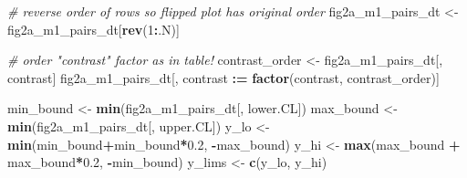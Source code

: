 \documentclass[]{book}
\newenvironment{Shaded}{\begin{snugshade}}{\end{snugshade}}
\newcommand{\CommentTok}[1]{\textcolor[rgb]{0.56,0.35,0.01}{\textit{#1}}}
\newcommand{\DecValTok}[1]{\textcolor[rgb]{0.00,0.00,0.81}{#1}}
\newcommand{\ErrorTok}[1]{\textcolor[rgb]{0.64,0.00,0.00}{\textbf{#1}}}
\newcommand{\FloatTok}[1]{\textcolor[rgb]{0.00,0.00,0.81}{#1}}
\newcommand{\KeywordTok}[1]{\textcolor[rgb]{0.13,0.29,0.53}{\textbf{#1}}}
\newcommand{\NormalTok}[1]{#1}
\newcommand{\OperatorTok}[1]{\textcolor[rgb]{0.81,0.36,0.00}{\textbf{#1}}}
\newcommand{\StringTok}[1]{\textcolor[rgb]{0.31,0.60,0.02}{#1}}
\begin{document}
\begin{Shaded}
\begin{Highlighting}[]
\CommentTok{# reverse order of rows so flipped plot has original order}
\NormalTok{fig2a_m1_pairs_dt <-}\StringTok{ }\NormalTok{fig2a_m1_pairs_dt[}\KeywordTok{rev}\NormalTok{(}\DecValTok{1}\OperatorTok{:}\NormalTok{.N)]}

\CommentTok{# order "contrast" factor as in table!}
\NormalTok{contrast_order <-}\StringTok{ }\NormalTok{fig2a_m1_pairs_dt[, contrast]}
\NormalTok{fig2a_m1_pairs_dt[, contrast }\OperatorTok{:}\ErrorTok{=}\StringTok{ }\KeywordTok{factor}\NormalTok{(contrast, contrast_order)]}

\NormalTok{min_bound <-}\StringTok{ }\KeywordTok{min}\NormalTok{(fig2a_m1_pairs_dt[, lower.CL])}
\NormalTok{max_bound <-}\StringTok{ }\KeywordTok{min}\NormalTok{(fig2a_m1_pairs_dt[, upper.CL])}
\NormalTok{y_lo <-}\StringTok{ }\KeywordTok{min}\NormalTok{(min_bound}\OperatorTok{+}\NormalTok{min_bound}\OperatorTok{*}\FloatTok{0.2}\NormalTok{,}
            \OperatorTok{-}\NormalTok{max_bound)}
\NormalTok{y_hi <-}\StringTok{ }\KeywordTok{max}\NormalTok{(max_bound }\OperatorTok{+}\StringTok{ }\NormalTok{max_bound}\OperatorTok{*}\FloatTok{0.2}\NormalTok{,}
            \OperatorTok{-}\NormalTok{min_bound)}
\NormalTok{y_lims <-}\StringTok{ }\KeywordTok{c}\NormalTok{(y_lo, y_hi)}


\end{Highlighting}
\end{Shaded}
\end{document}
